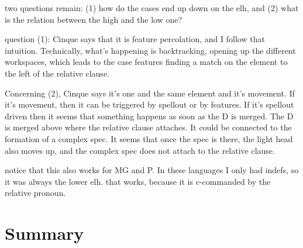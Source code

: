 two questions remain: (1) how do the cases end up down on the elh, and (2) what is the relation between the high and the low one?

question (1): Cinque says that it is feature percolation, and I follow that intuition. Technically, what's happening is backtracking, opening up the different workspaces, which leads to the case features finding a match on the element to the left of the relative clause.

Concerning (2), Cinque says it's one and the same element and it's movement. If it's movement, then it can be triggered by spellout or by features. If it's spellout driven then it seems that something happens as soon as the D is merged. The D is merged above where the relative clause attaches. It could be connected to the formation of a complex spec. It seems that once the spec is there, the light head also moves up, and the complex spec does not attach to the relative clause.

notice that this also works for MG and P. In these languages I only had indefs, so it was always the lower elh. that works, because it is c-commanded by the relative pronoun.



\section{Summary}
